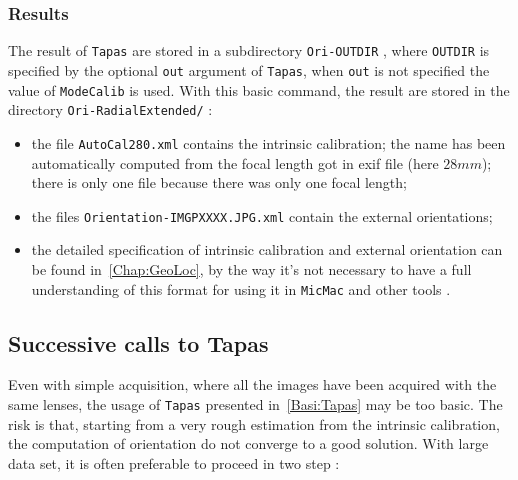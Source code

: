 \subsubsection{Results}

The result of {\tt Tapas} are stored in a subdirectory {\tt Ori-OUTDIR} , 
where {\tt OUTDIR} is specified by the optional {\tt out} argument of {\tt Tapas},
when {\tt out} is not specified the value of {\tt ModeCalib} is used.
With this basic command, the result are stored in the directory {\tt Ori-RadialExtended/} :



\begin{itemize}
   \item the file {\tt AutoCal280.xml} contains the intrinsic calibration; the name
         has been automatically computed from the focal length got in exif file (here $28 mm$);
         there is only one file because there was only one focal length;

   \item   the  files {\tt Orientation-IMGPXXXX.JPG.xml} contain the external orientations;

   \item  the detailed specification of intrinsic calibration and external orientation can
          be found in~\ref{Chap:GeoLoc}, by the way it's not necessary to have a full 
          understanding of this format for using it in {\tt MicMac} and  other tools .
\end{itemize}


\subsection{Successive calls to Tapas}

\label{Succ:Call:Tapas}

Even with simple acquisition, where all the images have been acquired with
the same lenses, the usage of {\tt Tapas} presented in~\ref{Basi:Tapas} may
be too basic.  The risk is that, starting from a very rough estimation from the
intrinsic calibration, the  computation of orientation do not converge to a
good solution.
With large data set, it is often preferable to proceed in two step :


